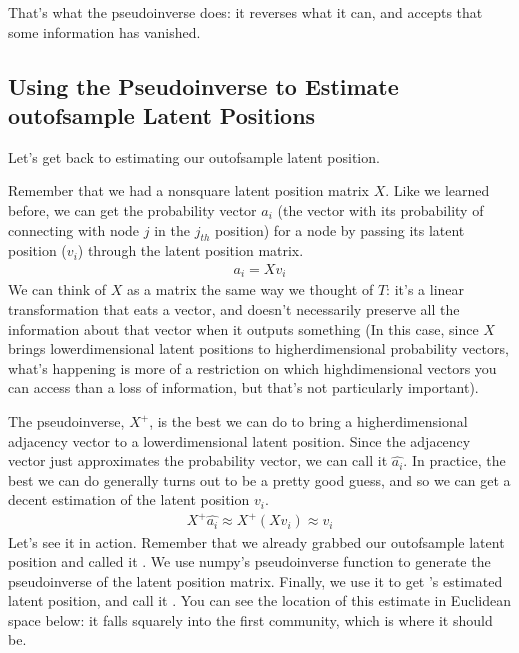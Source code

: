 \documentclass[letterpaper,10pt,english]{jupyterBook}
\begin{document}
\sphinxAtStartPar
That’s what the pseudoinverse does: it reverses what it can, and accepts that some information has vanished.

\noindent{}


\subsection{Using the Pseudoinverse to Estimate out\sphinxhyphen{}of\sphinxhyphen{}sample Latent Positions}
\label{\detokenize{applications/ch8/out-of-sample:using-the-pseudoinverse-to-estimate-out-of-sample-latent-positions}}
\sphinxAtStartPar
Let’s get back to estimating our out\sphinxhyphen{}of\sphinxhyphen{}sample latent position.

\sphinxAtStartPar
Remember that we had a nonsquare latent position matrix \(X\). Like we learned before, we can get the probability vector \(a_i\) (the vector with its probability of connecting with node \(j\) in the \(j_{th}\) position) for a node by passing its latent position (\(v_i\)) through the latent position matrix.
\begin{align*}
a_i = X v_i
\end{align*}
\sphinxAtStartPar
We can think of \(X\) as a matrix the same way we thought of \(T\): it’s a linear transformation that eats a vector, and doesn’t necessarily preserve all the information about that vector when it outputs something (In this case, since \(X\) brings lower\sphinxhyphen{}dimensional latent positions to higher\sphinxhyphen{}dimensional probability vectors, what’s happening is more of a restriction on which high\sphinxhyphen{}dimensional vectors you can access than a loss of information, but that’s not particularly important).

\sphinxAtStartPar
The pseudoinverse, \(X^+\), is the best we can do to bring a higher\sphinxhyphen{}dimensional adjacency vector to a lower\sphinxhyphen{}dimensional latent position. Since the adjacency vector just approximates the probability vector, we can call it \(\hat{a_i}\). In practice, the best we can do generally turns out to be a pretty good guess, and so we can get a decent estimation of the latent position \(v_i\).
\begin{align*}
X^+ \hat{a_i} \approx X^+ (X v_i) \approx v_i
\end{align*}
\sphinxAtStartPar
Let’s see it in action. Remember that we already grabbed our out\sphinxhyphen{}of\sphinxhyphen{}sample latent position and called it . We use numpy’s pseudoinverse function to generate the pseudoinverse of the latent position matrix. Finally, we use it to get ’s estimated latent position, and call it . You can see the location of this estimate in Euclidean space below: it falls squarely into the first community, which is where it should be.
\end{document}
